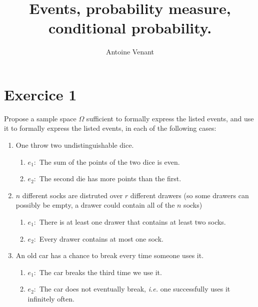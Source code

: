 \documentclass{article}
\title{Events, probability measure, conditional probability.}
\author{Antoine Venant}
\begin{document}
\maketitle


\section*{Exercice 1}

Propose a sample space $\Omega$ sufficient to formally express the listed events, and use it to formally express the listed events, in each of the following cases:

\begin{enumerate}
\item One throw two undistinguishable dice.
  \begin{enumerate}
  \item $e_1: $ The sum of the points of the two dice is even.
  \item $e_2: $ The second die has more points than the first.
  \end{enumerate}

\item $n$ different socks are distruted over $r$ different drawers (so some drawers can possibly be empty, a drawer could contain all of the $n$ socks)
  \begin{enumerate}
  \item $e_1: $ There is at least one drawer that contains at least two socks.
  \item $e_2: $ Every drawer contains at most one sock.
  \end{enumerate}
\item An old car has a chance to break every time someone uses it.
  \begin{enumerate}
  \item $e_1: $ The car breaks the third time we use it.
  \item $e_2: $ The car does not eventually break, \emph{i.e.} one successfully uses it infinitely often. 
  \end{enumerate}
\end{enumerate}
\end{document}
